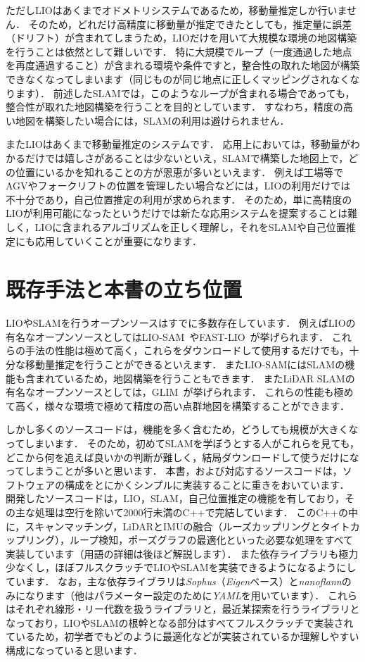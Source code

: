 ただしLIOはあくまでオドメトリシステムであるため，移動量推定しか行いません．
そのため，どれだけ高精度に移動量が推定できたとしても，推定量に誤差（ドリフト）が含まれてしまうため，LIOだけを用いて大規模な環境の地図構築を行うことは依然として難しいです．
特に大規模でループ（一度通過した地点を再度通過すること）が含まれる環境や条件ですと，整合性の取れた地図が構築できなくなってしまいます（同じものが同じ地点に正しくマッピングされなくなります）．
前述したSLAMでは，このようなループが含まれる場合であっても，整合性が取れた地図構築を行うことを目的としています．
すなわち，精度の高い地図を構築したい場合には，SLAMの利用は避けられません．

またLIOはあくまで移動量推定のシステムです．
応用上においては，移動量がわかるだけでは嬉しさがあることは少ないといえ，SLAMで構築した地図上で，どの位置にいるかを知れることの方が恩恵が多いといえます．
例えば工場等でAGVやフォークリフトの位置を管理したい場合などには，LIOの利用だけでは不十分であり，自己位置推定の利用が求められます．
そのため，単に高精度のLIOが利用可能になったというだけでは新たな応用システムを提案することは難しく，LIOに含まれるアルゴリズムを正しく理解し，それをSLAMや自己位置推定にも応用していくことが重要になります．





\section{既存手法と本書の立ち位置}

LIOやSLAMを行うオープンソースはすでに多数存在しています．
例えばLIOの有名なオープンソースとしてはLIO-SAM~\cite{liosam2020shan}やFAST-LIO~\cite{FAST-LIO2}が挙げられます．
これらの手法の性能は極めて高く，これらをダウンロードして使用するだけでも，十分な移動量推定を行うことができるといえます．
またLIO-SAMにはSLAMの機能も含まれているため，地図構築を行うこともできます．
またLiDAR SLAMの有名なオープンソースとしては，GLIM~\cite{KoideRAS2024}が挙げられます．
これらの性能も極めて高く，様々な環境で極めて精度の高い点群地図を構築することができます．

しかし多くのソースコードは，機能を多く含むため，どうしても規模が大きくなってしまいます．
そのため，初めてSLAMを学ぼうとする人がこれらを見ても，どこから何を追えば良いかの判断が難しく，結局ダウンロードして使うだけになってしまうことが多いと思います．
本書，および対応するソースコードは，ソフトウェアの構成をとにかくシンプルに実装することに重きをおいています．
開発したソースコードは，LIO，SLAM，自己位置推定の機能を有しており，その主な処理は空行を除いて2000行未満のC++で完結しています．
このC++の中に，スキャンマッチング，LiDARとIMUの融合（ルーズカップリングとタイトカップリング），ループ検知，ポーズグラフの最適化といった必要な処理をすべて実装しています（用語の詳細は後ほど解説します）．
また依存ライブラリも極力少なくし，ほぼフルスクラッチでLIOやSLAMを実装できるようになるようにしています．
なお，主な依存ライブラリは{\it Sophus}（{\it Eigen}ベース）と{\it nanoflann}のみになります（他はパラメーター設定のために{\it YAML}を用いています）．
これらはそれぞれ線形・リー代数を扱うライブラリと，最近某探索を行うライブラリとなっており，LIOやSLAMの根幹となる部分はすべてフルスクラッチで実装されているため，初学者でもどのように最適化などが実装されているか理解しやすい構成になっていると思います．


